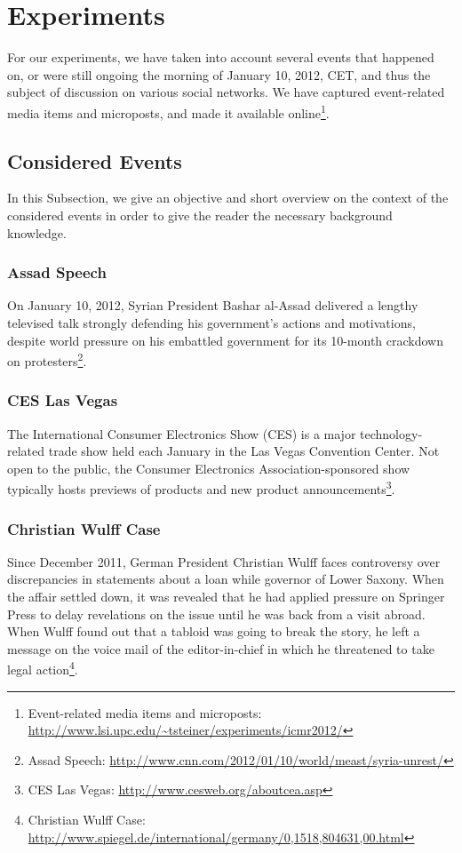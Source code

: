 \documentclass{acm_proc_article-sp}
\newcommand{\inlinelistingsize}{\fontsize{8pt}{11pt}}
\let\oldurl\url
\renewcommand{\url}[1]{\inlinelistingsize\oldurl{#1}}
\begin{document}
\section{Experiments}
For our experiments, we have taken into account several events that happened on, or were still ongoing the morning of January 10, 2012, CET, and thus the subject of discussion on various social networks.
We have captured event-related media items and microposts, and made it available online\footnote{Event-related media items and microposts: \url{http://www.lsi.upc.edu/~tsteiner/experiments/icmr2012/}}. 

\subsection{Considered Events}
In this Subsection, we give an objective and short overview on the context of the considered events in order to give the reader the necessary background knowledge.

\subsubsection{Assad Speech}
On January 10, 2012, Syrian President Bashar al-Assad delivered a lengthy televised talk strongly defending his government's actions and motivations, despite world pressure on his embattled government for its 10-month crackdown on protesters\footnote{Assad Speech: \url{http://www.cnn.com/2012/01/10/world/meast/syria-unrest/}}. 

\subsubsection{CES Las Vegas}
The International Consumer Electronics Show (CES) is a major technology-related trade show held each January in the Las Vegas Convention Center.
Not open to the public, the Consumer Electronics Association-sponsored show typically hosts previews of products and new product announcements\footnote{CES Las Vegas: \url{http://www.cesweb.org/aboutcea.asp}}.

\subsubsection{Christian Wulff Case}
Since December 2011, German President Christian Wulff faces controversy over discrepancies in statements about a loan while governor of Lower Saxony.
When the affair settled down, it was revealed that he had applied pressure on Springer Press to delay revelations on the issue until he was back from a visit abroad.
When Wulff found out that a tabloid was going to break the story, he left a message on the voice mail of the editor-in-chief in which he threatened to take legal action\footnote{Christian Wulff Case: \url{http://www.spiegel.de/international/germany/0,1518,804631,00.html}}.
\end{document}
